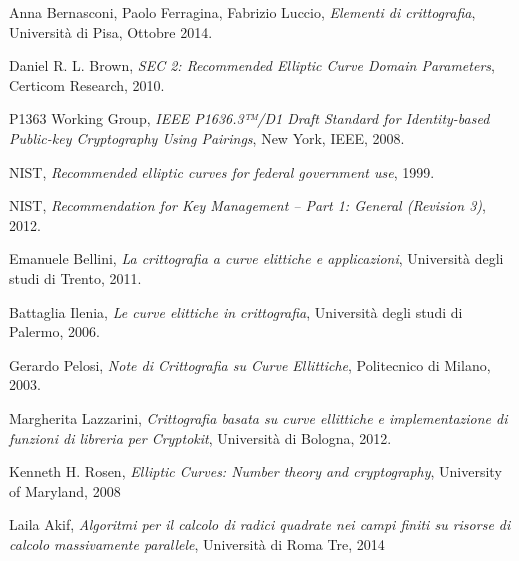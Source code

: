 \documentclass{article}
\begin{document}
	\begin{thebibliography}{99}
		Anna Bernasconi, Paolo Ferragina, Fabrizio Luccio,
		\textit{Elementi di crittografia},
		Università di Pisa,
		Ottobre 2014.
		
		Daniel R. L. Brown,
		\textit{SEC 2: Recommended Elliptic Curve Domain Parameters},
		Certicom Research,
		2010.
		
		P1363 Working Group,
		\textit{IEEE P1636.3™/D1 Draft Standard for Identity-based Public-key Cryptography Using Pairings},
		New York, IEEE,
		2008.
		
		NIST,
		\textit{Recommended elliptic curves for federal government use},
		1999.
		
		NIST,
		\textit{Recommendation for Key Management – Part 1: General (Revision 3)},
		2012.
		
		Emanuele Bellini,
		\textit{La crittografia a curve elittiche e applicazioni},
		Università degli studi di Trento,
		2011.
		
		Battaglia Ilenia,
		\textit{Le curve elittiche in crittografia},
		Università degli studi di Palermo,
		2006.
		
		Gerardo Pelosi,
		\textit{Note di Crittografia su Curve Ellittiche},
		Politecnico di Milano,
		2003.
		
		Margherita Lazzarini,
		\textit{Crittografia basata su curve ellittiche	e implementazione di funzioni di libreria per Cryptokit},
		Università di Bologna,
		2012.
		
		Kenneth H. Rosen,
		\textit{Elliptic Curves: Number theory and cryptography},
		University of Maryland,
		2008
		
		Laila Akif,
		\textit{Algoritmi per il calcolo di radici quadrate nei campi finiti su risorse di calcolo massivamente parallele},
		Università di Roma Tre,
		2014
		
	\end{thebibliography}
	
	
	\appendix
	
	\clearpage
	
	
\end{document}
